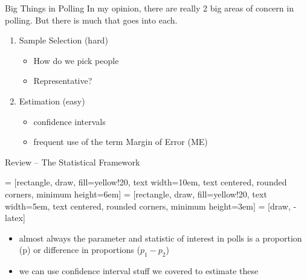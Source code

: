 \documentclass{beamer}
\begin{document}
\begin{frame}{Big Things in Polling}
In my opinion, there are really 2 big areas of concern in polling. But there is much that goes into each. \vspace{4mm}

\begin{enumerate}
    \item Sample Selection (hard)
    \begin{itemize}
        \item How do we pick people
        \item Representative?
    \end{itemize}
    \vspace{6mm}
    \item Estimation (easy)
    \begin{itemize}
        \item confidence intervals
        \item frequent use of the term Margin of Error (ME)
    \end{itemize}
\end{enumerate}
\end{frame}

\begin{frame}{Review -- The Statistical Framework}
\begin{center}
\usetikzlibrary{decorations.pathreplacing,positioning, arrows, shapes, calc,shapes.multipart}
 = [rectangle, draw, fill=yellow!20, 
    text width=10em, text centered, rounded corners, minimum height=6em]
 = [rectangle, draw, fill=yellow!20, 
    text width=5em, text centered, rounded corners, minimum height=3em]
 = [draw, -latex]
  \end{center}
\begin{itemize}
    \item almost always the parameter and statistic of interest in polls is a proportion (p) or difference in proportions ($p_1 - p_2$)
    \item we can use confidence interval stuff we covered to estimate these
\end{itemize} 
\end{frame}
\end{document}
